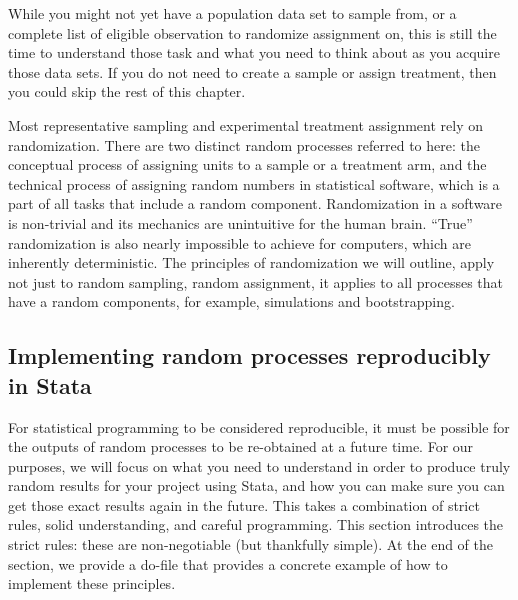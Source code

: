 While you might not yet have a population data set to sample from, 
or a complete list of eligible observation to randomize assignment on, 
this is still the time to understand those task 
and what you need to think about as you acquire those data sets.
If you do not need to create a sample or assign treatment, 
then you could skip the rest of this chapter.


Most representative sampling and experimental treatment assignment rely on randomization.
There are two distinct random processes referred to here:
the conceptual process of assigning units to a sample or a treatment arm,
and the technical process of assigning random numbers in statistical software,
which is a part of all tasks that include a random component.
Randomization in a software is non-trivial and its mechanics are unintuitive for the human brain.
``True'' randomization is also nearly impossible to achieve for computers,
which are inherently deterministic.
The principles of randomization we will outline, apply not just to random sampling, random assignment, 
it applies to all processes that have a random components, for example, simulations and bootstrapping.



\subsection{Implementing random processes reproducibly in Stata}

For statistical programming to be considered reproducible, it must be possible for the outputs of random processes
to be re-obtained at a future time.\cite{orozco2018make}
For our purposes, we will focus on what you need to understand
in order to produce truly random results for your project using Stata,
and how you can make sure you can get those exact results again in the future.
This takes a combination of strict rules, solid understanding, and careful programming.
This section introduces the strict rules: these are non-negotiable (but thankfully simple). 
At the end of the section, 
we provide a do-file that provides a concrete example of how to implement these principles. 


